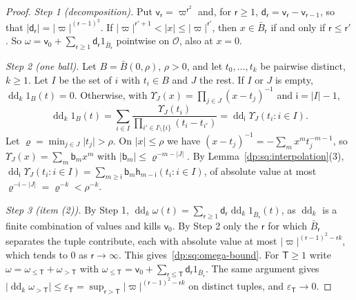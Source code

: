 \documentclass[11pt]{amsart}
\theoremstyle{definition}
\theoremstyle{remark}
\numberwithin{equation}{section}
\newcommand{\abs}[1]{\lvert #1\rvert}
\theoremstyle{plain}
\theoremstyle{definition}
\theoremstyle{plain}
\begin{document}
\begin{proof}
\emph{Step 1 (decomposition).} Put $\mathsf v_{\mathsf r}=\varpi^{\mathsf r^2}$ and, for $\mathsf r\ge1$, $\mathsf d_{\mathsf r}=\mathsf v_{\mathsf r}-\mathsf v_{\mathsf r-1}$, so that $\abs{\mathsf d_{\mathsf r}}=\abs\varpi^{(\mathsf r-1)^2}$. If $\abs\varpi^{\mathsf r'+1}<\abs x\le\abs\varpi^{\mathsf r'}$, then $x\in\bar B_{\mathsf r}$ if and only if $\mathsf r\le\mathsf r'$. So $\omega=\mathsf v_0+\sum_{\mathsf r\ge1}\mathsf d_{\mathsf r}1_{\bar B_{\mathsf r}}$ pointwise on $\mathcal O$, also at $x=0$.

\emph{Step 2 (one ball).} Let $B=\bar B(0,\rho)$, $\rho>0$, and let $t_0,\dots,t_k$ be pairwise distinct, $k\ge1$. Let $I$ be the set of $i$ with $t_i\in B$ and $J$ the rest. If $I$ or $J$ is empty, $\operatorname{dd}_k1_B(t)=0$. Otherwise, with $\Upsilon_J(x)=\prod_{j\in J}(x-t_j)^{-1}$ and $\mathsf i=\abs I-1$,
\[
 \operatorname{dd}_k1_B(t)=\sum_{i\in I}\frac{\Upsilon_J(t_i)}{\prod_{i'\in I\setminus\{i\}}(t_i-t_{i'})}=\operatorname{dd}_{\mathsf i}\Upsilon_J(t_i:i\in I).
\]
Let $\varrho=\min_{j\in J}\abs{t_j}>\rho$. On $\abs x\le\rho$ we have $(x-t_j)^{-1}=-\sum_mx^mt_j^{-m-1}$, so $\Upsilon_J(x)=\sum_m\mathsf b_mx^m$ with $\abs{\mathsf b_m}\le\varrho^{-m-\abs J}$. By Lemma~\ref{dp:sq:interpolation}(3), $\operatorname{dd}_{\mathsf i}\Upsilon_J(t_i:i\in I)=\sum_{m\ge\mathsf i}\mathsf b_m\mathsf h_{m-\mathsf i}(t_i:i\in I)$, of absolute value at most $\varrho^{-\mathsf i-\abs J}=\varrho^{-k}<\rho^{-k}$.

\emph{Step 3 (item (2)).} By Step 1, $\operatorname{dd}_k\omega(t)=\sum_{\mathsf r\ge1}\mathsf d_{\mathsf r}\operatorname{dd}_k1_{\bar B_{\mathsf r}}(t)$, as $\operatorname{dd}_k$ is a finite combination of values and kills $\mathsf v_0$. By Step 2 only the $\mathsf r$ for which $\bar B_{\mathsf r}$ separates the tuple contribute, each with absolute value at most $\abs\varpi^{(\mathsf r-1)^2-\mathsf rk}$, which tends to $0$ as $\mathsf r\to\infty$. This gives~\eqref{dp:sq:omega-bound}. For $\mathsf T\ge1$ write $\omega=\omega_{\le\mathsf T}+\omega_{>\mathsf T}$ with $\omega_{\le\mathsf T}=\mathsf v_0+\sum_{\mathsf r\le\mathsf T}\mathsf d_{\mathsf r}1_{\bar B_{\mathsf r}}$. The same argument gives $\abs{\operatorname{dd}_k\omega_{>\mathsf T}}\le\varepsilon_{\mathsf T}=\sup_{\mathsf r>\mathsf T}\abs\varpi^{(\mathsf r-1)^2-\mathsf rk}$ on distinct tuples, and $\varepsilon_{\mathsf T}\to0$.


\end{proof}
\end{document}
